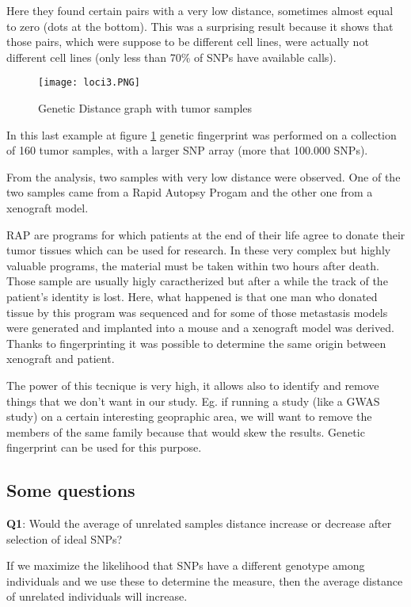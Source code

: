 Here they found certain pairs with a very low distance, sometimes almost equal to zero (dots at the bottom). This was a surprising result because it shows that those pairs, which were suppose to be different cell lines, were actually not different cell lines (only less than 70\% of SNPs have available calls).

\begin{figure}[H]
	\texttt{[image: loci3.PNG]}
	\caption{\label{fig:Distance3}Genetic Distance graph with tumor samples}
\end{figure}

\bigskip
In this last example at figure \ref{fig:Distance3} genetic fingerprint was performed on a collection of 160  tumor samples, with a larger SNP array (more that 100.000 SNPs).

From the analysis, two samples with very low distance were observed. One of the two samples came from a
Rapid Autopsy Progam and the other one from a xenograft model.

RAP are programs for which patients at the end of their life agree to donate their tumor tissues which can be used for research. In these very complex but highly valuable programs, the material must be taken within two hours after death. Those sample are usually higly caractherized but after a while the track of the patient's identity is lost.
Here, what happened is that one man who donated tissue by this program was sequenced and for some of those metastasis models were generated and implanted into a mouse and a xenograft model was derived. Thanks to fingerprinting it was possible to determine the same origin between xenograft and patient.

The power of this tecnique is very high, it allows also to identify and remove things that we don't want in our study. Eg. if running a study (like a GWAS study) on a certain interesting geopraphic area, we will want to remove the members of the same family because that would skew the results. Genetic fingerprint can be used for this purpose.

\subsection{Some questions}

\textbf{Q1}: Would the average of unrelated samples distance increase or decrease after selection of ideal SNPs?

If we maximize the likelihood that SNPs have a different genotype among individuals and we use these to determine the measure, then the average distance of unrelated individuals will increase.

